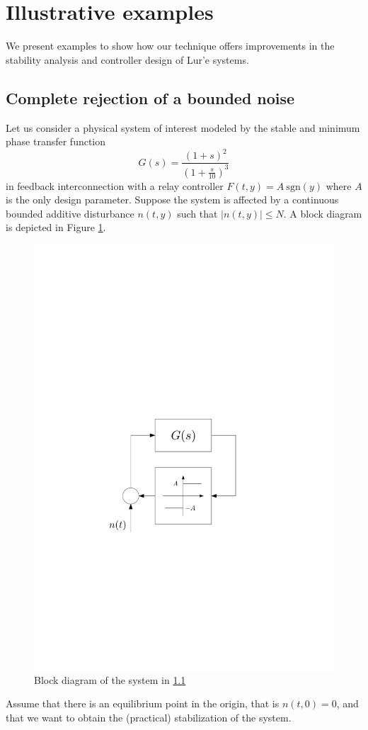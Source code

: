 \documentclass[letterpaper,10pt,conference,twocolumn]{IEEEtran}
\newcommand{\sgn}{\mathrm{sgn}}
\begin{document}
\section{Illustrative examples}\label{sec:examples}
We present examples to show how our technique offers improvements in the stability analysis and controller design of Lur'e systems.
\subsection{Complete rejection of a bounded noise}\label{ex:boundednoise}
Let us consider a physical system of interest modeled by the stable and minimum phase transfer function
\begin{equation}\label{eq:TF_ex01}
	G(s)=\frac{(1+s)^2}
		{\left(1+\frac{s}{10}\right)^3}
\end{equation}
in feedback interconnection with a relay controller $F(t,y)=A~\sgn(y)$
where $A$ is the only design parameter.
Suppose the system is affected by a continuous bounded additive disturbance $n(t,y)$ such that $|n(t,y)|\leq N$.
A block diagram is depicted in Figure \ref{fig:ex1scheme}.
\begin{figure}
	\centering
	\includegraphics[width=0.5\columnwidth]{ex1scheme}
	\caption{Block diagram of the system in \ref{ex:boundednoise} \label{fig:ex1scheme}}
\end{figure}
Assume that there is an equilibrium point in the origin, that is $n(t,0)=0$,
and that we want to obtain the (practical) stabilization of the system.
\end{document}
